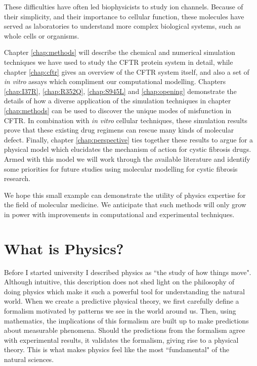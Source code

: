 These difficulties have often led biophysicists to study ion channels. Because of their simplicity, and their importance to cellular function, these molecules have served as laboratories to understand more complex biological systems, such as whole cells or organisms. 

Chapter \ref{chap:methods} will describe the chemical and numerical simulation techniques we have used to study the CFTR protein system in detail, while chapter \ref{chap:cftr} gives an overview of the CFTR system itself, and also a set of \textit {in vitro} assays which compliment our computational modelling.  Chapters \ref{chap:I37R}, \ref{chap:R352Q}, \ref{chap:S945L} and \ref{chap:opening} demonstrate the details of how a diverse application of the simulation techniques in chapter \ref{chap:methods} can be used to discover the unique modes of misfunction in CFTR. In combination with \textit {in vitro} cellular techniques, these simulation results prove that these existing drug regimens can rescue many kinds of molecular defect. Finally, chapter \ref{chap:perspective} ties together these results to argue for a physical model which elucidates the mechanism of action for cystic fibrosis drugs. Armed with this model we will work through the available literature and identify some priorities for future studies using molecular modelling for cystic fibrosis research. 


We hope this small example can demonstrate the utility of physics expertise for the field of molecular medicine. We anticipate that such methods will only grow in power with improvements in computational and experimental techniques.

\section{What is Physics?}
\label{WIP}
Before I started university I described physics as ``the study of how things move". Although intuitive, this description does not shed light on the philosophy of doing physics which make it such a powerful tool for understanding the natural world. When we create a predictive physical theory, we first carefully define a formalism motivated by patterns we see in the world around us. Then, using mathematics, the implications of this formalism are built up to make predictions about measurable phenomena. Should the predictions from the formalism agree with experimental results, it validates the formalism, giving rise to a physical theory. This is what makes physics feel like the most ``fundamental" of the natural sciences.

